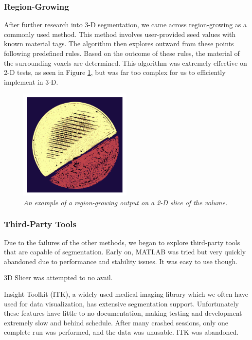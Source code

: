 \documentclass[11pt, letterpaper]{article}
\begin{document}
    \subsubsection{Region-Growing}
        After further research into 3-D segmentation, we came across region-growing as a commonly used method. This method involves user-provided seed values with known material tags. The algorithm then explores outward from these points following predefined rules. Based on the outcome of these rules, the material of the surrounding voxels are determined. This algorithm was extremely effective on 2-D tests, as seen in Figure \ref{fig:region-growing}, but was far too complex for us to efficiently implement in 3-D.

        \begin{figure}[H]
            \centering
            \label{fig:region-growing}
            \includegraphics[width=0.5\textwidth]{region-growing.png}
            \caption{\emph{An example of a region-growing output on a 2-D slice of the volume.}}
        \end{figure}

    \subsubsection{Third-Party Tools}
        Due to the failures of the other methods, we began to explore third-party tools that are capable of segmentation. Early on, MATLAB was tried but very quickly abandoned due to performance and stability issues. It was easy to use though.

        3D Slicer was attempted to no avail.

        Insight Toolkit (ITK), a widely-used medical imaging library which we often have used for data visualization, has extensive segmentation support. Unfortunately these features have little-to-no documentation, making testing and development extremely slow and behind schedule. After many crashed sessions, only one complete run was performed, and the data was unusable. ITK was abandoned.
\end{document}
